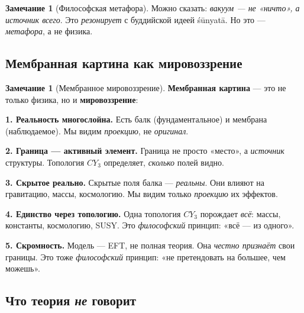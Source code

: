 \documentclass[11pt,a4paper]{article}
\newcommand{\CY}{CY_3}
\theoremstyle{definition}
\newtheorem{remark}[theorem]{Замечание}
\begin{document}
\begin{remark}[Философская метафора]
\label{rem:shunyata-metaphor}
Можно сказать: \emph{вакуум — не «ничто», а источник всего}. 
Это \emph{резонирует} с буддийской идеей śūnyatā. Но это — 
\emph{метафора}, а не физика.
\end{remark}

\subsection{Мембранная картина как мировоззрение}
\label{subsec:membrane-worldview-phil}

\begin{remark}[Мембранное мировоззрение]
\label{rem:membrane-worldview-phil}
\textbf{Мембранная картина} — это не только физика, но и 
\textbf{мировоззрение}:

\medskip\noindent
\textbf{1. Реальность многослойна.}
Есть балк (фундаментальное) и мембрана (наблюдаемое). 
Мы видим \emph{проекцию}, не \emph{оригинал}.

\medskip\noindent
\textbf{2. Граница — активный элемент.}
Граница не просто «место», а \emph{источник} структуры. 
Топология $\CY$ определяет, \emph{сколько} полей видно.

\medskip\noindent
\textbf{3. Скрытое реально.}
Скрытые поля балка — \emph{реальны}. Они влияют на гравитацию, 
массы, космологию. Мы видим только \emph{проекцию} их эффектов.

\medskip\noindent
\textbf{4. Единство через топологию.}
Одна топология $\CY$ порождает \emph{всё}: массы, константы, 
космологию, SUSY. Это \emph{философский} принцип: 
«всё — из одного».

\medskip\noindent
\textbf{5. Скромность.}
Модель — EFT, не полная теория. Она \emph{честно признаёт} 
свои границы. Это тоже \emph{философский} принцип: 
«не претендовать на большее, чем можешь».
\end{remark}

\subsection{Что теория \emph{не} говорит}
\label{subsec:what-not-says}
\end{document}
